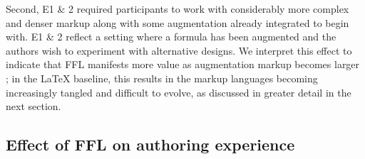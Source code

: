 Second, E1 \& 2 required participants to work with considerably more complex and denser markup along with some augmentation already integrated to begin with. E1 \& 2 reflect a setting where a formula has been augmented and the authors wish to experiment with alternative designs. We interpret this effect to indicate that FFL manifests more value as augmentation markup becomes larger ; in the LaTeX baseline, this results in the markup languages becoming increasingly tangled and difficult to evolve, as discussed in greater detail in the next section.



\subsection{Effect of FFL on authoring experience}

